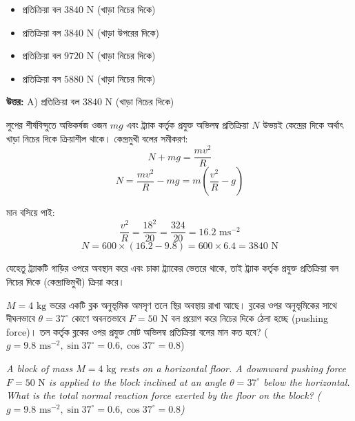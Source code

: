 \documentclass[12pt, a4paper]{article}
\begin{document}
\begin{itemize}[label={}, leftmargin=1cm, itemsep=0.5em]
\item[\textbf{A)}] প্রতিক্রিয়া বল $3840\text{ N}$ (খাড়া নিচের দিকে)
\item[\textbf{B)}] প্রতিক্রিয়া বল $3840\text{ N}$ (খাড়া উপরের দিকে)
\item[\textbf{C)}] প্রতিক্রিয়া বল $9720\text{ N}$ (খাড়া নিচের দিকে)
\item[\textbf{D)}] প্রতিক্রিয়া বল $5880\text{ N}$ (খাড়া নিচের দিকে)
\end{itemize}

\vspace{0.5em}
\begin{tcolorbox}[answerbox]
\textbf{\color{success} উত্তর:} A) প্রতিক্রিয়া বল $3840\text{ N}$ (খাড়া নিচের দিকে)
\end{tcolorbox}
\vspace{1em}

\begin{tcolorbox}[solutionbox={সমাধান (Solution)}]
\noindent
লুপের শীর্ষবিন্দুতে অভিকর্ষজ ওজন $mg$ এবং ট্র্যাক কর্তৃক প্রযুক্ত অভিলম্ব প্রতিক্রিয়া $N$ উভয়ই কেন্দ্রের দিকে অর্থাৎ খাড়া নিচের দিকে ক্রিয়াশীল থাকে। 
কেন্দ্রমুখী বলের সমীকরণ:
\[ N + mg = \frac{m v^2}{R} \]
\[ N = \frac{m v^2}{R} - mg = m \left(\frac{v^2}{R} - g\right) \]

মান বসিয়ে পাই:
\[ \frac{v^2}{R} = \frac{18^2}{20} = \frac{324}{20} = 16.2\text{ ms}^{-2} \]
\[ N = 600 \times (16.2 - 9.8) = 600 \times 6.4 = 3840\text{ N} \]

যেহেতু ট্র্যাকটি গাড়ির ওপরে অবস্থান করে এবং চাকা ট্র্যাকের ভেতরে থাকে, তাই ট্র্যাক কর্তৃক প্রযুক্ত প্রতিক্রিয়া বল নিচের দিকে (কেন্দ্রাভিমুখী) ক্রিয়া করে।
\end{tcolorbox}


\begin{tcolorbox}[questionbox={প্রশ্ন (Question) 13}]
\noindent
$M = 4\text{ kg}$ ভরের একটি ব্লক অনুভূমিক অমসৃণ তলে স্থির অবস্থায় রাখা আছে। ব্লকের ওপর অনুভূমিকের সাথে দীঘলভাবে $\theta = 37^\circ$ কোণে অবনতভাবে $F = 50\text{ N}$ বল প্রয়োগ করে নিচের দিকে ঠেলা হচ্ছে (pushing force)। তল কর্তৃক ব্লকের ওপর প্রযুক্ত মোট অভিলম্ব প্রতিক্রিয়া বলের মান কত হবে? ($g = 9.8\text{ ms}^{-2}, \sin 37^\circ = 0.6, \cos 37^\circ = 0.8$)

\vspace{0.8em}
\begin{english}
\noindent\textit{\color{darkgray}
A block of mass $M = 4\text{ kg}$ rests on a horizontal floor. A downward pushing force $F = 50\text{ N}$ is applied to the block inclined at an angle $\theta = 37^\circ$ below the horizontal. What is the total normal reaction force exerted by the floor on the block? ($g = 9.8\text{ ms}^{-2}, \sin 37^\circ = 0.6, \cos 37^\circ = 0.8$)
}
\end{english}
\end{tcolorbox}
\end{document}
